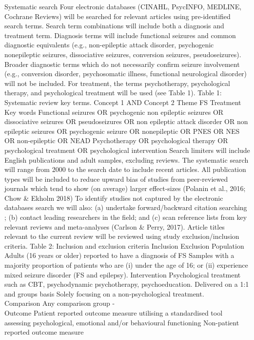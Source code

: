 \documentclass[
  12pt,
  openany]{book}
\begin{document}
Systematic search
Four electronic databases (CINAHL, PsycINFO, MEDLINE, Cochrane Reviews) will be searched for relevant articles using pre-identified search terms. Search term combinations will include both a diagnosis and treatment term. Diagnosis terms will include functional seizures and common diagnostic equivalents (e.g., non-epileptic attack disorder, psychogenic nonepileptic seizures, dissociative seizures, conversion seizures, pseudoseizures). Broader diagnostic terms which do not necessarily confirm seizure involvement (e.g., conversion disorder, psychosomatic illness, functional neurological disorder) will not be included. For treatment, the terms psychotherapy, psychological therapy, and psychological treatment will be used (see Table 1).
Table 1:
Systematic review key terms.
Concept 1 AND Concept 2
Theme FS Treatment
Key words Functional seizures OR psychogenic non epileptic seizures OR dissociative seizures OR pseudoseizures OR non epileptic attack disorder OR non epileptic seizures OR psychogenic seizure OR nonepileptic OR PNES OR NES OR non-epileptic OR NEAD Psychotherapy OR psychological therapy OR psychological treatment OR psychological intervention
Search limiters will include English publications and adult samples, excluding reviews. The systematic search will range from 2000 to the search date to include recent articles. All publication types will be included to reduce upward bias of studies from peer-reviewed journals which tend to show (on average) larger effect-sizes (Polanin et al., 2016; Chow \& Ekholm 2018) To identify studies not captured by the electronic databases search we will also: (a) undertake forward/backward citation searching ; (b) contact leading researchers in the field; and (c) scan reference lists from key relevant reviews and meta-analyses (Carlson \& Perry, 2017). Article titles relevant to the current review will be reviewed using study exclusion/inclusion criteria.
Table 2:
Inclusion and exclusion criteria
Inclusion Exclusion
Population Adults (16 years or older) reported to have a diagnosis of FS Samples with a majority proportion of patients who are (i) under the age of 16; or (ii) experience mixed seizure disorder (FS and epilepsy).
Intervention Psychological treatment such as CBT, psychodynamic psychotherapy, psychoeducation. Delivered on a 1:1 and groups basis Solely focusing on a non-psychological treatment.\\
Comparison Any comparison group -\\
Outcome Patient reported outcome measure utilising a standardised tool assessing psychological, emotional and/or behavioural functioning Non-patient reported outcome measure
\end{document}
